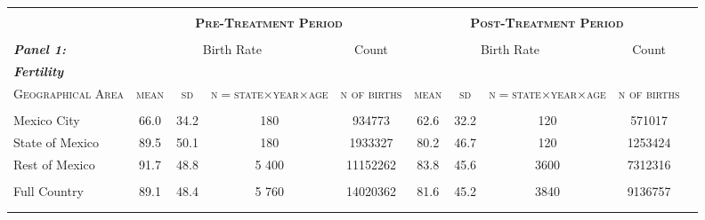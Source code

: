 \begin{tabular}{lccccccccc}
\hline\hline
&		&		&		&		&		&		&		&		\\
	\multirow{1}{*}{} &
	\multicolumn{4}{c}{\textbf{\textsc{Pre-Treatment Period}}}&\multicolumn{4}{c}{\textbf{\textsc{Post-Treatment Period}}}\\ \cmidrule(r){2-5} \cmidrule(l){6-10}
	&  &  &  &  & 	&  &  &  &     \\
	\multirow{1}{*}{\textbf{\textit{Panel 1:}}} &
	\multicolumn{3}{c}{Birth Rate}&\multicolumn{1}{c}{Count}&\multicolumn{3}{c}{Birth Rate}&\multicolumn{1}{c}{Count}\\ \cmidrule(r){2-4}\cmidrule(r){5-5} \cmidrule(l){6-8}\cmidrule(l){9-9}
\textbf{\textit{Fertility}}	&  &  &  &  & 	&  &  &  &     \\
\textsc{Geographical Area}	&	\textsc{mean}	&	\textsc{sd}	&	\textsc{n$=$state$\times$year$\times$age}	&	\textsc{n of births}	&	\textsc{mean}	&	\textsc{sd}	&		\textsc{n$=$state$\times$year$\times$age}	&	\textsc{n of births}	\\\cmidrule(r){2-5} \cmidrule(l){6-9}
&		&		&		&		&		&		&	 	&		\\
Mexico City	&	 66.0  	&	 34.2  	&	 180    	&	 934773    	&	 62.6  	&	 32.2  	&	120	&	571017	\\
State of Mexico 	&	 89.5  	&	 50.1  	&	 180    	&	 1933327    	&	 80.2  	&	 46.7  	&	120	&	1253424	\\
Rest of Mexico	&	 91.7  	&	 48.8  	&	 5 400    	&	 11152262    	&	 83.8  	&	 45.6  	&	3600	&	7312316	\\
&		&		&		&	   	&		&		&		&		\\
Full Country	&	 89.1  	&	 48.4  	&	 5 760    	&	 14020362    	&	 81.6  	&	 45.2  	&	3840	&	9136757	\\
&		&		&		&		&		&		&		&		\\
&		&		&		&		&		&		&		&		\\
 

\end{tabular}
